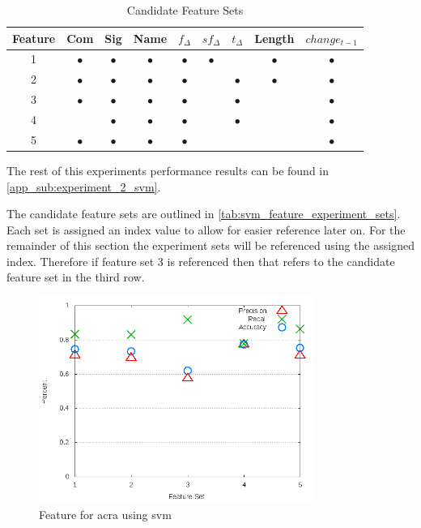 \begin{table}[ht]
\begin{center}

    \begin{tabular}{|c|c|c|c|c|c|c|c|c|}
        \hline
        Feature & Com & Sig & Name & $f_{\Delta}$ & $sf_{\Delta}$ & $t_\Delta$ & Length & $change_{t-1}$ \\
         \hline
        1 & $\bullet$ & $\bullet$ & $\bullet$ & $\bullet$ & $\bullet$ & & $\bullet$ & $\bullet$ \\
        2 & $\bullet$ & $\bullet$ & $\bullet$ & $\bullet$ & & $\bullet$ & $\bullet$ & $\bullet$ \\
        3 & $\bullet$ & $\bullet$ & $\bullet$ & $\bullet$ & & $\bullet$ & & $\bullet$ \\
        4 & & $\bullet$ & $\bullet$ & $\bullet$ & & $\bullet$ & & $\bullet$ \\
        5 & $\bullet$ & $\bullet$ & $\bullet$ & $\bullet$ & & & & $\bullet$ \\ \hline
    \end{tabular}
    \caption{Candidate Feature Sets}
    \label{tab:svm_feature_experiment_sets}
\end{center}
\end{table}

The rest of this experiments performance results can be found in \autoref{app_sub:experiment_2_svm}.

The candidate feature sets are outlined in \autoref{tab:svm_feature_experiment_sets}. Each set is assigned an index value to allow for easier reference later on. For the remainder of this section the experiment sets will be referenced using the assigned index. Therefore if feature set 3 is referenced then that refers to the candidate feature set in the third row.

\begin{figure}[!t]
    \centering

        \includegraphics[width=0.8\textwidth]{images/svm/test_3/acra_sample_range}
        \caption{Feature for acra using \gls{svm}}
        \label{fig:test_3_acra_svm}
\end{figure}

